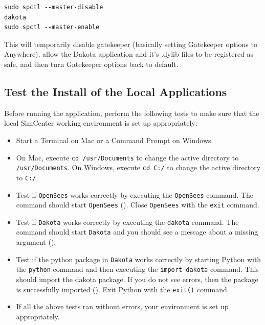 \begin{verbatim}
sudo spctl --master-disable
dakota
sudo spctl --master-enable
\end{verbatim}

This will temporarily disable gatekeeper (basically setting Gatekeeper options to Anywhere), allow the Dakota application and it's .dylib files to be registered as safe, and then turn Gatekeeper options back to default.



\subsection{Test the Install of the Local Applications}

Before running the \texttt{\getsoftwarename{}} application, perform the following tests to
make sure that the local SimCenter working environment is set up
appropriately:

\begin{itemize}
    \item Start a Terminal on Mac or a Command Prompt on Windows.
    \item On Mac, execute \texttt{cd /usr/Documents} to change the active directory to \texttt{/usr/Documents}. On Windows, execute \texttt{cd C:/} to change the active directory to \texttt{C:/}.
    \item Test if \texttt{OpenSees} works correctly by executing the \texttt{OpenSees} command. The command should start \texttt{OpenSees} (). Close \texttt{OpenSees} with the \texttt{exit} command.
    \item Test if \texttt{Dakota} works correctly by executing the \texttt{dakota} command. The command should start \texttt{Dakota} and you should see a message about a missing argument ().
    \item Test if the python package in \texttt{Dakota} works correctly by starting Python with the \texttt{python} command and then executing the \texttt{import dakota} command. This should import the dakota package. If you do not see errors, then the package is successfully imported (). Exit Python with the \texttt{exit()} command.
    \item If all the above tests ran without errors, your environment is set up appropriately.
\end{itemize}

